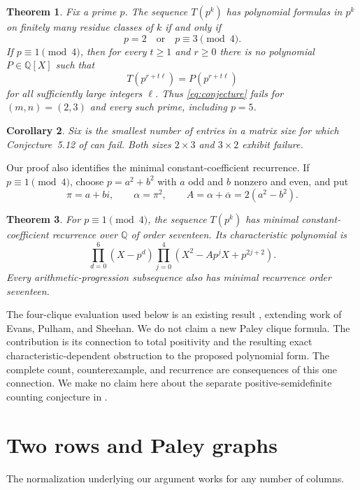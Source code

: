 \documentclass[11pt]{article}
\newtheorem{theorem}{Theorem}
\newtheorem{corollary}[theorem]{Corollary}
\newcommand{\Q}{\mathbb Q}
\begin{document}
\begin{theorem}\label{thm:towers}
Fix a prime $p$. The sequence $T(p^k)$ has polynomial formulas in $p^k$ on finitely many residue classes of $k$ if and only if
\[
 p=2\quad\text{or}\quad p\equiv3\pmod4.
\]
If $p\equiv1\pmod4$, then for every $t\ge1$ and $r\ge0$ there is no polynomial $P\in\Q[X]$ such that
\[
 T(p^{r+t\ell})=P(p^{r+t\ell})
\]
for all sufficiently large integers $\ell$. Thus \eqref{eq:conjecture} fails for $(m,n)=(2,3)$ and every such prime, including $p=5$.
\end{theorem}

\begin{corollary}\label{cor:minimal}
Six is the smallest number of entries in a matrix size for which Conjecture~5.12 of \cite{AP} can fail. Both sizes $2\times3$ and $3\times2$ exhibit failure.
\end{corollary}

Our proof also identifies the minimal constant-coefficient recurrence. If $p\equiv1\pmod4$, choose $p=a^2+b^2$ with $a$ odd and $b$ nonzero and even, and put
\begin{equation}\label{eq:alpha}
 \pi=a+bi,\qquad \alpha=\pi^2,\qquad A=\alpha+\overline\alpha=2(a^2-b^2).
\end{equation}

\begin{theorem}\label{thm:recurrence}
For $p\equiv1\pmod4$, the sequence $T(p^k)$ has minimal constant-coefficient recurrence over $\Q$ of order seventeen. Its characteristic polynomial is
\begin{equation}\label{eq:recurrence}
 \prod_{d=0}^6(X-p^d)
 \prod_{j=0}^4\left(X^2-Ap^jX+p^{2j+2}\right).
\end{equation}
Every arithmetic-progression subsequence also has minimal recurrence order seventeen.
\end{theorem}

The four-clique evaluation used below is an existing result \cite[Corollary~2.3]{DM}, extending work of Evans, Pulham, and Sheehan. We do not claim a new Paley clique formula. The contribution is its connection to total positivity and the resulting exact characteristic-dependent obstruction to the proposed polynomial form. The complete count, counterexample, and recurrence are consequences of this one connection. We make no claim here about the separate positive-semidefinite counting conjecture in \cite[Conjecture~4.31]{AP}.

\section{Two rows and Paley graphs}
The normalization underlying our argument works for any number of columns.
\end{document}
